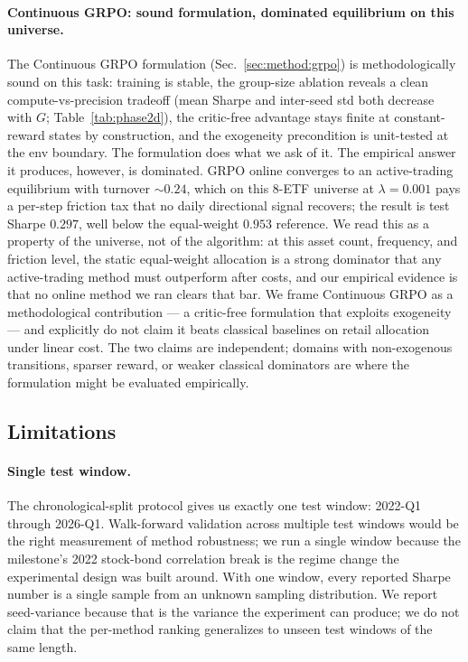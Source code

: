 \paragraph{Continuous GRPO: sound formulation, dominated equilibrium on
this universe.} The Continuous GRPO formulation (Sec.~\ref{sec:method:grpo})
is methodologically sound on this task: training is stable, the
group-size ablation reveals a clean compute-vs-precision tradeoff
(mean Sharpe and inter-seed std both decrease with $G$;
Table~\ref{tab:phase2d}), the critic-free advantage stays finite at
constant-reward states by construction, and the exogeneity precondition
is unit-tested at the env boundary. The formulation does what we ask
of it. The empirical answer it produces, however, is dominated. GRPO
online converges to an active-trading equilibrium with turnover $\sim
0.24$, which on this 8-ETF universe at $\lambda{=}0.001$ pays a per-step
friction tax that no daily directional signal recovers; the result is
test Sharpe $0.297$, well below the equal-weight $0.953$ reference. We
read this as a property of the universe, not of the algorithm: at this
asset count, frequency, and friction level, the static equal-weight
allocation is a strong dominator that any active-trading method must
outperform after costs, and our empirical evidence is that no online
method we ran clears that bar. We frame Continuous GRPO as a
methodological contribution --- a critic-free formulation that exploits
exogeneity --- and explicitly do not claim it beats classical baselines
on retail allocation under linear cost. The two claims are independent;
domains with non-exogenous transitions, sparser reward, or weaker
classical dominators are where the formulation might be evaluated
empirically.

\subsection{Limitations}
\label{sec:limit}

\paragraph{Single test window.} The chronological-split protocol gives
us exactly one test window: 2022-Q1 through 2026-Q1. Walk-forward
validation across multiple test windows would be the right measurement
of method robustness; we run a single window because the milestone's
2022 stock-bond correlation break is the regime change the experimental
design was built around. With one window, every reported Sharpe number
is a single sample from an unknown sampling distribution. We report
seed-variance because that is the variance the experiment can produce;
we do not claim that the per-method ranking generalizes to unseen test
windows of the same length.

